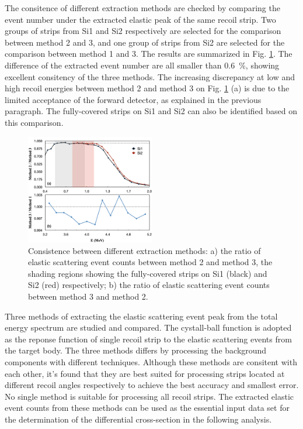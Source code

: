 \documentclass[fleqn,twocolumn,a4paper]{ikpar}
\begin{document}
The consitence of different extraction methods are checked by comparing the event
number under the extracted elastic peak of the same recoil strip.
Two groups of strips from Si1 and Si2 respectively are selected for the
comparison between method 2 and 3, and one group of strips from Si2 are selected
for the comparison between method 1 and 3.
The results are summarized in Fig. \ref{fig:extraction_consistence}.
The difference of the extracted event number are all smaller than \SI{0.6}{\percent},
showing excellent consitency of the three methods.
The increasing discrepancy at low and high recoil energies between method 2 and
method 3 on Fig. \ref{fig:extraction_consistence} (a) is due to the limited
acceptance of the forward detector, as explained in the previous paragraph.
The fully-covered strips on Si1 and Si2 can also be identified based on this comparison.
\begin{figure}[!htb]
	\includegraphics[width=0.5\textwidth]{./comparison_methods.png}
  \caption{Consistence between different extraction
    methods: a) the ratio of elastic scattering event counts between method 2 and
    method 3, the shading regions showing the fully-covered strips on Si1
    (black) and Si2 (red) respectively; b) the ratio of elastic scattering event counts between method 3 and
    method 2.}
  \label{fig:extraction_consistence}
\end{figure}

\par
\medskip

Three methods of extracting the elastic scattering event peak from the total
energy spectrum are studied and compared.
The cystall-ball function is adopted as the reponse function of single recoil strip to the
elastic scattering events from the target body.
The three methods differs by processing the background components with different techniques.
Although these methods are consitent with each other, it's found that they are best suited for
processing strips located at different recoil angles respectively to achieve the best accuracy
and smallest error.
No single method is suitable for processing all recoil strips.
The extracted elastic event counts from these methods can be used as
the essential input data set for the determination of the differential cross-section in the following analysis.
\end{document}
